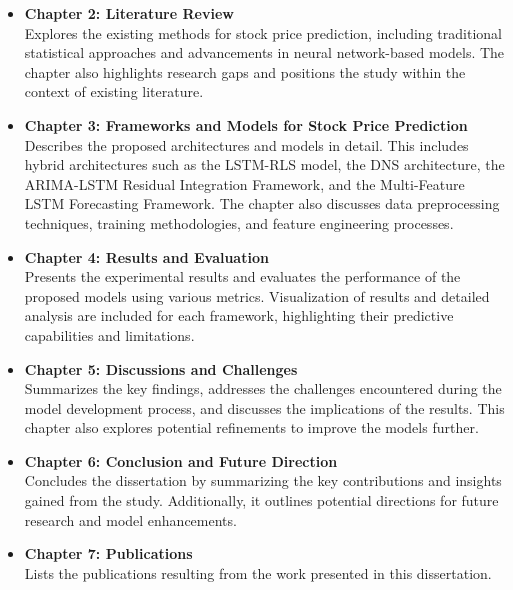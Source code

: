 \begin{itemize}
    \item \textbf{Chapter 2: Literature Review} \\
    Explores the existing methods for stock price prediction, including traditional statistical approaches and advancements in neural network-based models. The chapter also highlights research gaps and positions the study within the context of existing literature.
    
    \item \textbf{Chapter 3: Frameworks and Models for Stock Price Prediction} \\
    Describes the proposed architectures and models in detail. This includes hybrid architectures such as the LSTM-RLS model, the DNS architecture, the ARIMA-LSTM Residual Integration Framework, and the Multi-Feature LSTM Forecasting Framework. The chapter also discusses data preprocessing techniques, training methodologies, and feature engineering processes.
    
    \item \textbf{Chapter 4: Results and Evaluation} \\
    Presents the experimental results and evaluates the performance of the proposed models using various metrics. Visualization of results and detailed analysis are included for each framework, highlighting their predictive capabilities and limitations.
    
    \item \textbf{Chapter 5: Discussions and Challenges} \\
    Summarizes the key findings, addresses the challenges encountered during the model development process, and discusses the implications of the results. This chapter also explores potential refinements to improve the models further.
    
    \item \textbf{Chapter 6: Conclusion and Future Direction} \\
    Concludes the dissertation by summarizing the key contributions and insights gained from the study. Additionally, it outlines potential directions for future research and model enhancements.
    
    \item \textbf{Chapter 7: Publications} \\
    Lists the publications resulting from the work presented in this dissertation.

\end{itemize}